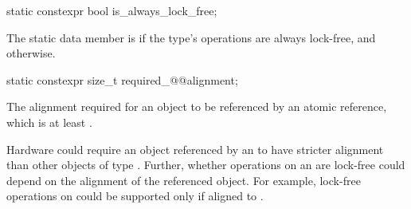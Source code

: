 \begin{itemdecl}
static constexpr bool is_always_lock_free;
\end{itemdecl}

\begin{itemdescr}
\pnum
The static data member  is 
if the  type's operations are always lock-free,
and  otherwise.
\end{itemdescr}

\begin{itemdecl}
static constexpr size_t required_@@alignment;
\end{itemdecl}

\begin{itemdescr}
\pnum
The alignment required for an object to be referenced  by an atomic reference,
which is at least . 

\pnum
\begin{note}
Hardware could require an object
referenced by an 
to have stricter alignment
than other objects of type .
Further, whether operations on an 
are lock-free could depend on the alignment of the referenced object.
For example, lock-free operations on 
could be supported only if aligned to .
\end{note}
\end{itemdescr}


